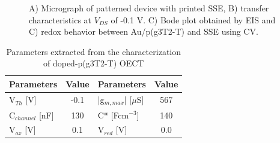\begin{figure}[ht]
    \centering
    \qquad
    \caption[Performance of solid-OECT with doped-p(g3T2-T)]{A) Micrograph of patterned device with printed SSE, B) transfer characteristics at $V_{DS}$ of -0.1 V. C) Bode plot obtained by EIS and C) redox behavior between Au/p(g3T2-T) and SSE using CV.}
    \label{fig:dopedSSE}
\end{figure}

\begin{table}[ht]
\centering
\caption{Parameters extracted from the characterization of doped-p(g3T2-T) OECT}
\begin{tabular}{l|c||l|c}
Parameters & Value & Parameters & Value \\\hline \hline
V$_{Th}$ [V] & -0.1 & |g$_{m,max}$| [$\mu$S] & 567 \\
C$_{channel}$ [nF] & 130 & C* [Fcm$^{-3}$] &  140 \\
V$_{ox}$ [V] & 0.1 & V$_{red}$ [V] & 0.0 \\\hline
\end{tabular}
\label{tab:dopedfom}
\end{table}

